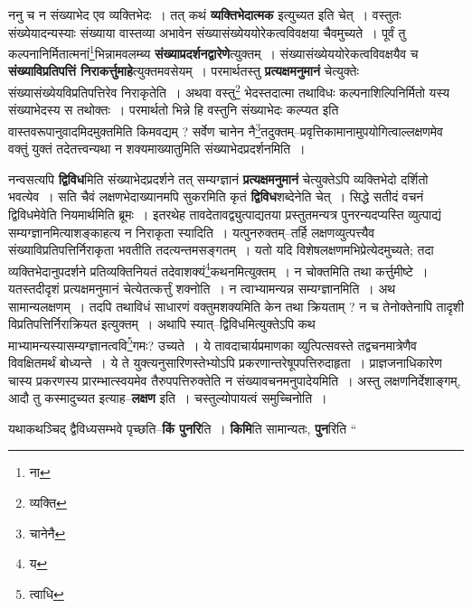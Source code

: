 \documentclass[article,12pt,a4paper]{memoir}
\begin{document}
	  \pstart ननु च न संख्याभेद एव व्यक्तिभेदः । तत् कथं \textbf{व्यक्तिभेदात्मक} इत्युच्यत इति चेत् । वस्तुतः संख्येयादन्यस्याः संख्याया वास्तव्या अभावेन संख्यासंख्येययोरेकत्वविवक्षया चैवमुच्यते । पूर्वं तु कल्पनानिर्मितात्मनां\footnote{ना}भिन्नामवलम्ब्य \textbf{संख्याप्रदर्शनद्वारेणे}त्युक्तम् । संख्यासंख्येययोरेकत्वविवक्षयैव च \textbf{संख्याविप्रतिपत्तिं निराकर्त्तुमाहे}त्युक्तमवसेयम् । परमार्थतस्तु \textbf{प्रत्यक्षमनुमानं} चेत्युक्तेः संख्यासंख्येयविप्रतिपत्तिरेव निराकृतेति । अथवा वस्तु\footnote{व्यक्ति} भेदस्तदात्मा तथाविधः कल्पनाशिल्पिनिर्मितो यस्य संख्याभेदस्य स तथोक्तः । परमार्थतो भिन्ने हि वस्तुनि संख्याभेदः कल्प्यत इति वास्तवरूपानुवादमिदमुक्तमिति किमवद्यम् ? सर्वेण चानेन नै\footnote{चानेनै}तदुक्तम्--प्रवृत्तिकामानामुपयोगित्वाल्लक्षणमेव वक्तुं युक्तं तदेतत्त्वन्यथा न शक्यमाख्यातुमिति संख्याभेदप्रदर्शनमिति ।
	\pend
      

	  \pstart नन्वसत्यपि \textbf{द्विविध}मिति संख्याभेदप्रदर्शने तत् सम्यग्ज्ञानं \textbf{प्रत्यक्षमनुमानं} चेत्युक्तेऽपि व्यक्तिभेदो दर्शितो भवत्येव । सति चैवं लक्षणभेदाख्यानमपि सुकरमिति कृतं \textbf{द्विविध}शब्देनेति चेत् । सिद्धे सतीदं वचनं द्विविधमेवेति नियमार्थमिति ब्रूमः । इतरथेह तावदेतावद्व्युत्पाद्यतया प्रस्तुतमन्यत्र पुनरन्यदप्यस्ति व्युत्पाद्यं सम्यग्ज्ञानमित्याशङ्काहत्य न निराकृता स्यादिति । यत्पुनरुक्तम्--तर्हि लक्षणव्युत्पत्त्यैव संख्याविप्रतिपत्तिर्निराकृता भवतीति तदत्यन्तमसङ्गतम् । यतो यदि विशेषलक्षणमभिप्रेत्येदमुच्यते; तदा व्यक्तिभेदानुपदर्शने प्रतिव्यक्तिनियतं तदेवाशक्यं\footnote{य}कथनमित्युक्तम् । न चोक्तमिति तथा कर्त्तुमीष्टे । यतस्तदीदृशं प्रत्यक्षमनुमानं चेत्येतत्कर्त्तुं शक्नोति । न त्वाभ्यामन्यन्न सम्यग्ज्ञानमिति । अथ सामान्यलक्षणम् । तदपि तथाविधं साधारणं वक्तुमशक्यमिति केन तथा क्रियताम् ? न च तेनोक्तेनापि तादृशी विप्रतिपत्तिर्निराक्रियत इत्युक्तम् । अथापि स्यात्--द्विविधमित्युक्तेऽपि कथ \leavevmode{} माभ्यामन्यस्यासम्यग्ज्ञानत्ववि\footnote{त्वाधि}गमः? उच्यते । ये तावदाचार्यप्रमाणका व्युत्पित्सवस्ते तद्वचनमात्रेणैव विवक्षितमर्थं बोध्यन्ते । ये ते युक्त्यनुसारिणस्तेभ्योऽपि प्रकरणान्तरेषूपपत्तिरुदाहृता । प्राज्ञजनाधिकारेण चास्य प्रकरणस्य प्रारम्भात्स्वयमेव तैरुपपत्तिरुक्तेति न संख्यावचनमनुपादेयमिति । अस्तु लक्षणनिर्देशाङ्गम्, आदौ तु कस्मादुच्यत इत्याह--\textbf{लक्षण} इति । चस्तुल्योपायत्वं समुच्चिनोति ।
	\pend
      

	  \pstart यथाकथञ्चिद् द्वैविध्यसम्भवे पृच्छति--\textbf{किं पुनरि}ति । \textbf{किमि}ति सामान्यतः, \textbf{पुन}रिति \leavevmode{} “
	  
\end{document}

